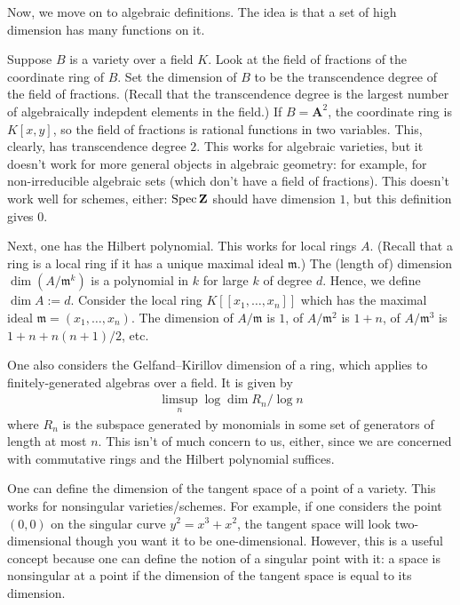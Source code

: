 \documentclass [11 pt, oneside, margin = 1 in] {article}
\begin{document}
Now, we move on to algebraic definitions. The idea is that a set of high dimension has many functions on it.

Suppose $B$ is a variety over a field $K$. Look at the field of fractions of the coordinate ring of $B$. Set the dimension of $B$ to be the transcendence degree of the field of fractions. (Recall that the transcendence degree is the largest number of algebraically indepdent elements in the field.) If $B=\mathbf{A}^2$, the coordinate ring is $K[x,y]$, so the field of fractions is rational functions in two variables. This, clearly, has transcendence degree $2$. This works for algebraic varieties, but it doesn't work for more general objects in algebraic geometry: for example, for non-irreducible algebraic sets (which don't have a field of fractions). This doesn't work well for schemes, either: $\operatorname{Spec} \mathbf Z$ should have dimension $1$, but this definition gives $0$.

Next, one has the Hilbert polynomial. This works for local rings $A$. (Recall that a ring is a local ring if it has a unique maximal ideal $\mathfrak{m}$.) The (length of) dimension $\dim(A/\mathfrak{m}^k)$ is a polynomial in $k$ for large $k$ of degree $d$. Hence, we define $\dim A := d$. Consider the local ring $K [\![x_1,\hdots, x_n]\!]$ which has the maximal ideal $\mathfrak{m} = (x_1,\hdots, x_n)$. The dimension of $A/\mathfrak{m}$ is $1$, of $A/\mathfrak{m}^2$ is $1+n$, of $A/\mathfrak{m}^3$ is $1+n+n(n+1)/2$, etc.

One also considers the Gelfand--Kirillov dimension of a ring, which applies to finitely-generated algebras over a field. It is given by
\begin{align*}
	\limsup_{n} \log \dim R_n / \log n
\end{align*}
where $R_n$ is the subspace generated by monomials in some set of generators of length at most $n$. This isn't of much concern to us, either, since we are concerned with commutative rings and the Hilbert polynomial suffices.

One can define the dimension of the tangent space of a point of a variety. This works for nonsingular varieties/schemes. For example, if one considers the point $(0,0)$ on the singular curve $y^2=x^3+x^2$, the tangent space will look two-dimensional though you want it to be one-dimensional. However, this is a useful concept because one can define the notion of a singular point with it: a space is nonsingular at a point if the dimension of the tangent space is equal to its dimension.
\end{document}
